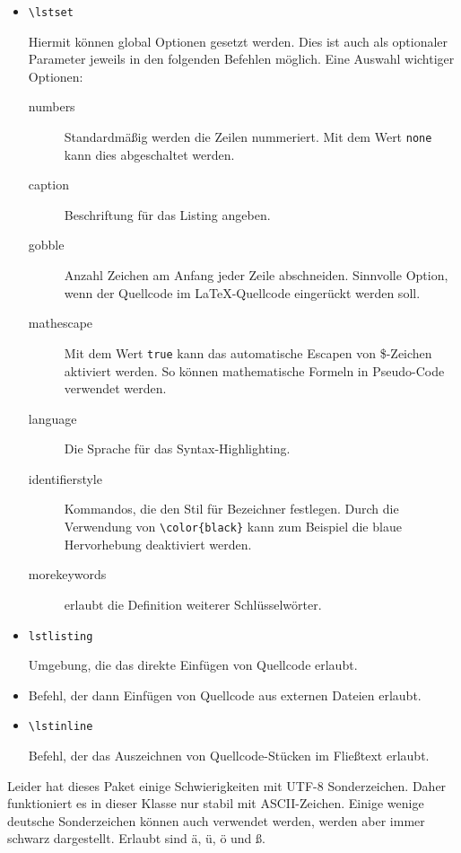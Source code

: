 \documentclass{exercise}
\begin{document}
    \begin{itemize}
      \item \lstinline{\lstset}

        Hiermit können global Optionen gesetzt werden. Dies ist auch als
        optionaler Parameter jeweils in den folgenden Befehlen möglich. Eine
        Auswahl wichtiger Optionen:
        \begin{description}
          \item[numbers] Standardmäßig werden die Zeilen nummeriert. Mit dem
            Wert \texttt{none} kann dies abgeschaltet werden.
          \item[caption] Beschriftung für das Listing angeben.
          \item[gobble] Anzahl Zeichen am Anfang jeder Zeile abschneiden.
            Sinnvolle Option, wenn der Quellcode im
            \LaTeX{}-Quellcode eingerückt werden soll.
          \item[mathescape] Mit dem Wert \texttt{true} kann das automatische
            Escapen von \$-Zeichen aktiviert werden. So können mathematische
            Formeln in Pseudo-Code verwendet werden.
          \item[language] Die Sprache für das Syntax-Highlighting.
          \item[identifierstyle] Kommandos, die den Stil für Bezeichner
            festlegen. Durch die Verwendung von \lstinline!\color{black}!
            kann zum Beispiel die
            blaue Hervorhebung deaktiviert werden.
          \item[morekeywords] erlaubt die Definition weiterer Schlüsselwörter.
        \end{description}

      \item \lstinline{lstlisting}

        Umgebung, die das direkte Einfügen von Quellcode erlaubt.

      \item \lstinline{}

        Befehl, der dann Einfügen von Quellcode aus externen Dateien erlaubt.

      \item \lstinline{\lstinline}

        Befehl, der das Auszeichnen von Quellcode-Stücken im Fließtext erlaubt.
    \end{itemize}

    Leider hat dieses Paket einige Schwierigkeiten mit UTF-8 Sonderzeichen. Daher
    funktioniert es in dieser Klasse nur stabil mit ASCII-Zeichen. Einige wenige
    deutsche Sonderzeichen können auch verwendet werden, werden aber immer
    schwarz dargestellt. Erlaubt sind ä, ü, ö und ß.
\end{document}
